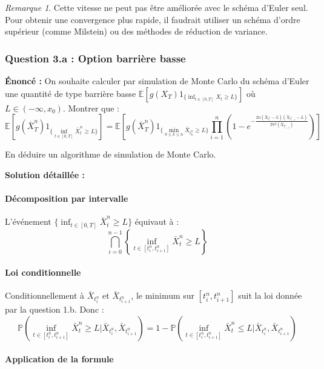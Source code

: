 \documentclass[12pt,a4paper]{article}
\theoremstyle{definition}
\theoremstyle{remark}
\newtheorem*{remark}{Remarque}
\newcommand{\E}{\mathbb{E}}
\newcommand{\Prob}{\mathbb{P}}
\begin{document}
\begin{remark}
Cette vitesse ne peut pas être améliorée avec le schéma d'Euler seul. Pour obtenir une convergence plus rapide, il faudrait utiliser un schéma d'ordre supérieur (comme Milstein) ou des méthodes de réduction de variance.
\end{remark}

\subsubsection{Question 3.a : Option barrière basse}

\textbf{Énoncé :} On souhaite calculer par simulation de Monte Carlo du schéma d'Euler une quantité de type barrière basse $\E[g(X_T)1_{\{\inf_{t \in [0,T]} X_t \geq L\}}]$ où $L \in (-\infty, x_0)$. Montrer que :
\[
\E[g(\bar{X}_T^n)1_{\{\inf_{t \in [0,T]} \bar{X}_t^n \geq L\}}] = \E\left[g(\bar{X}_T^n)1_{\{\min_{0 \leq k \leq n} \bar{X}_{t_k^n} \geq L\}} \prod_{i=1}^n \left(1 - e^{-\frac{2n(\bar{X}_{t_i^n}-L)(\bar{X}_{t_{i-1}^n}-L)}{T\sigma^2(\bar{X}_{t_{i-1}^n})}}\right)\right]
\]

En déduire un algorithme de simulation de Monte Carlo.

\textbf{Solution détaillée :}

\paragraph{Décomposition par intervalle}

L'événement $\{\inf_{t \in [0,T]} \bar{X}_t^n \geq L\}$ équivaut à :
\[
\bigcap_{i=0}^{n-1} \left\{\inf_{t \in [t_i^n, t_{i+1}^n]} \bar{X}_t^n \geq L\right\}
\]

\paragraph{Loi conditionnelle}

Conditionnellement à $\bar{X}_{t_i^n}$ et $\bar{X}_{t_{i+1}^n}$, le minimum sur $[t_i^n, t_{i+1}^n]$ suit la loi donnée par la question 1.b. Donc :
\[
\Prob\left(\inf_{t \in [t_i^n, t_{i+1}^n]} \bar{X}_t^n \geq L \Big| \bar{X}_{t_i^n}, \bar{X}_{t_{i+1}^n}\right) = 1 - \Prob\left(\inf_{t \in [t_i^n, t_{i+1}^n]} \bar{X}_t^n \leq L \Big| \bar{X}_{t_i^n}, \bar{X}_{t_{i+1}^n}\right)
\]

\paragraph{Application de la formule}
\end{document}
